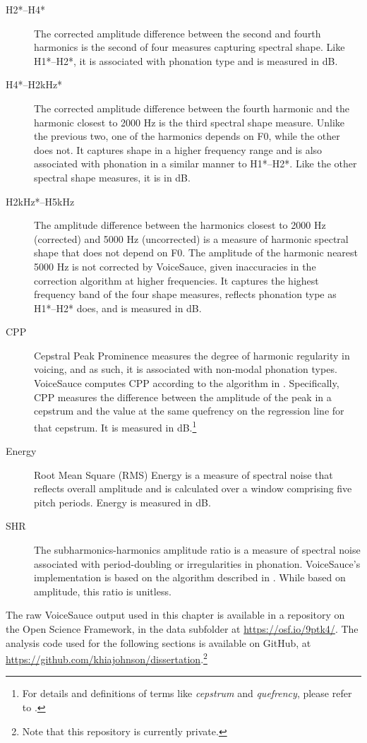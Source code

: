\begin{description}
    \item[H2*--H4*] The corrected amplitude difference between the second and fourth harmonics is the second of four measures capturing spectral shape. Like H1*--H2*, it is associated with phonation type and is measured in dB.
    \item[H4*--H2kHz*] The corrected amplitude difference between the fourth harmonic and the harmonic closest to 2000 Hz is the third spectral shape measure. Unlike the previous two, one of the harmonics depends on F0, while the other does not. It captures shape in a higher frequency range and is also associated with phonation in a similar manner to H1*--H2*. Like the other spectral shape measures, it is in dB.
    \item[H2kHz*--H5kHz] The amplitude difference between the harmonics closest to 2000 Hz (corrected) and 5000 Hz (uncorrected) is a measure of harmonic spectral shape that does not depend on F0. The amplitude of the harmonic nearest 5000 Hz is not corrected by VoiceSauce, given inaccuracies in the correction algorithm at higher frequencies. It captures the highest frequency band of the four shape measures, reflects phonation type as H1*--H2* does, and is measured in dB.
    \item[CPP] Cepstral Peak Prominence measures the degree of harmonic regularity in voicing, and as such, it is associated with non-modal phonation types. VoiceSauce computes CPP according to the algorithm in \citet{hillenbrand_1994_acoustic}. Specifically, CPP measures the difference between the amplitude of the peak in a cepstrum and the value at the same quefrency on the regression line for that cepstrum. It is measured in dB.\footnote{For details and definitions of terms like \textit{cepstrum} and \textit{quefrency}, please refer to \citet{hillenbrand_1994_acoustic}.}
    \item[Energy] Root Mean Square (RMS) Energy is a measure of spectral noise that reflects overall amplitude and is calculated over a window comprising five pitch periods. Energy is measured in dB.
    \item[SHR] The subharmonics-harmonics amplitude ratio is a measure of spectral noise associated with period-doubling or irregularities in phonation. VoiceSauce's implementation is based on the algorithm described in \cite{sun_2002_shr}. While based on amplitude, this ratio is unitless. 
\end{description}

The raw VoiceSauce output used in this chapter is available in a repository on the Open Science Framework, in the data subfolder at \url{https://osf.io/9ptk4/}. The analysis code used for the following sections is available on GitHub, at \url{https://github.com/khiajohnson/dissertation}.\footnote{Note that this repository is currently private.}

